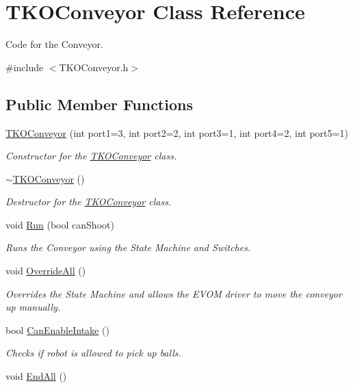 \hypertarget{class_t_k_o_conveyor}{\section{T\-K\-O\-Conveyor Class Reference}
\label{class_t_k_o_conveyor}
}


Code for the Conveyor.  




{\ttfamily \#include $<$T\-K\-O\-Conveyor.\-h$>$}

\subsection*{Public Member Functions}
\begin{DoxyCompactItemize}
\item 
\hyperlink{class_t_k_o_conveyor_a68d6a4bdf4c7f640da4977366c2e6add}{T\-K\-O\-Conveyor} (int port1=3, int port2=2, int port3=1, int port4=2, int port5=1)
\begin{DoxyCompactList}\small\item\em Constructor for the \hyperlink{class_t_k_o_conveyor}{T\-K\-O\-Conveyor} class. \end{DoxyCompactList}\item 
\hypertarget{class_t_k_o_conveyor_a869440830ff95697005f839227d198eb}{\hyperlink{class_t_k_o_conveyor_a869440830ff95697005f839227d198eb}{$\sim$\-T\-K\-O\-Conveyor} ()}\label{class_t_k_o_conveyor_a869440830ff95697005f839227d198eb}

\begin{DoxyCompactList}\small\item\em Destructor for the \hyperlink{class_t_k_o_conveyor}{T\-K\-O\-Conveyor} class. \end{DoxyCompactList}\item 
void \hyperlink{class_t_k_o_conveyor_ac46547907a0ff74117d63e134d1c5985}{Run} (bool can\-Shoot)
\begin{DoxyCompactList}\small\item\em Runs the Conveyor using the State Machine and Switches. \end{DoxyCompactList}\item 
void \hyperlink{class_t_k_o_conveyor_aabaebf6851e31ec3c258534441aeb814}{Override\-All} ()
\begin{DoxyCompactList}\small\item\em Overrides the State Machine and allows the E\-V\-O\-M driver to move the conveyor up manually. \end{DoxyCompactList}\item 
bool \hyperlink{class_t_k_o_conveyor_ab998b5ba247e2dc337f01840cc6ade2f}{Can\-Enable\-Intake} ()
\begin{DoxyCompactList}\small\item\em Checks if robot is allowed to pick up balls. \end{DoxyCompactList}\item 
\hypertarget{class_t_k_o_conveyor_adf4e54d355bc30f1da5a822cdecece12}{void \hyperlink{class_t_k_o_conveyor_adf4e54d355bc30f1da5a822cdecece12}{End\-All} ()}\label{class_t_k_o_conveyor_adf4e54d355bc30f1da5a822cdecece12}


\end{DoxyCompactItemize}
